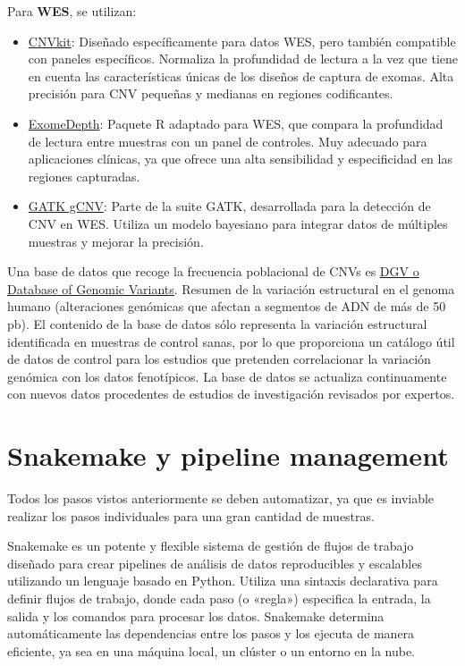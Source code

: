 Para \textbf{WES}, se utilizan:
\begin{itemize}
\item \href{https://cnvkit.readthedocs.io/en/stable/}{CNVkit}: Diseñado específicamente para datos WES, pero también compatible con paneles específicos. Normaliza la profundidad de lectura a la vez que tiene en cuenta las características únicas de los diseños de captura de exomas. Alta precisión para CNV pequeñas y medianas en regiones codificantes.
\item \href{https://github.com/vplagnol/ExomeDepth}{ExomeDepth}: Paquete R adaptado para WES, que compara la profundidad de lectura entre muestras con un panel de controles. Muy adecuado para aplicaciones clínicas, ya que ofrece una alta sensibilidad y especificidad en las regiones capturadas.
\item \href{https://www.nature.com/articles/s41588-023-01449-0}{GATK gCNV}: Parte de la suite GATK, desarrollada para la detección de CNV en WES. Utiliza un modelo bayesiano para integrar datos de múltiples muestras y mejorar la precisión.
\end{itemize}

Una base de datos que recoge la frecuencia poblacional de CNVs es \href{https://dgv.tcag.ca/dgv/app/about}{DGV o Database of Genomic Variants}. Resumen de la variación estructural en el genoma humano (alteraciones genómicas que afectan a segmentos de ADN de más de 50 pb). El contenido de la base de datos sólo representa la variación estructural identificada en muestras de control sanas, por lo que proporciona un catálogo útil de datos de control para los estudios que pretenden correlacionar la variación genómica con los datos fenotípicos. La base de datos se actualiza continuamente con nuevos datos procedentes de estudios de investigación revisados por expertos.

\chapter{Snakemake y pipeline management}
Todos los pasos vistos anteriormente se deben automatizar, ya que es inviable realizar los pasos individuales para una gran cantidad de muestras.

Snakemake es un potente y flexible sistema de gestión de flujos de trabajo diseñado para crear pipelines de análisis de datos reproducibles y escalables utilizando un lenguaje basado en Python.
Utiliza una sintaxis declarativa para definir flujos de trabajo, donde cada paso (o «regla») especifica la entrada, la salida y los comandos para procesar los datos.
Snakemake determina automáticamente las dependencias entre los pasos y los ejecuta de manera eficiente, ya sea en una máquina local, un clúster o un entorno en la nube.


